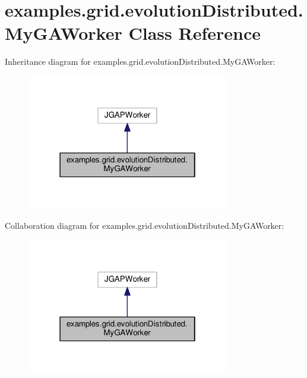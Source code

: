 \hypertarget{classexamples_1_1grid_1_1evolution_distributed_1_1_my_g_a_worker}{\section{examples.\-grid.\-evolution\-Distributed.\-My\-G\-A\-Worker Class Reference}
\label{classexamples_1_1grid_1_1evolution_distributed_1_1_my_g_a_worker}
}


Inheritance diagram for examples.\-grid.\-evolution\-Distributed.\-My\-G\-A\-Worker\-:
\nopagebreak
\begin{figure}[H]
\begin{center}
\leavevmode
\includegraphics[width=250pt]{classexamples_1_1grid_1_1evolution_distributed_1_1_my_g_a_worker__inherit__graph}
\end{center}
\end{figure}


Collaboration diagram for examples.\-grid.\-evolution\-Distributed.\-My\-G\-A\-Worker\-:
\nopagebreak
\begin{figure}[H]
\begin{center}
\leavevmode
\includegraphics[width=250pt]{classexamples_1_1grid_1_1evolution_distributed_1_1_my_g_a_worker__coll__graph}
\end{center}
\end{figure}
